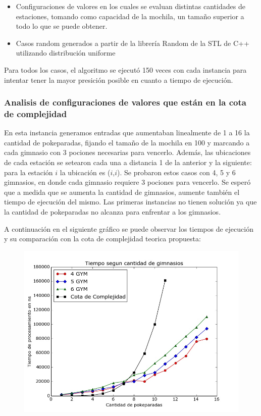       \begin{itemize}
        \item Configuraciones de valores en los cuales se evaluan distintas cantidades de estaciones, tomando como capacidad de la mochila, un tamaño superior a todo lo que se puede obtener.
        \item Casos random generados a partir de la librería Random de la STL de C++ utilizando distribución uniforme
      \end{itemize}

      Para todos los casos, el algoritmo se ejecutó 150 veces con cada instancia para intentar tener la mayor presición posible en cuanto a tiempo de ejecución.

      \subsubsection{Analisis de configuraciones de valores que están en la cota de complejidad}
      En esta instancia generamos entradas que aumentaban linealmente de 1 a 16 la cantidad de pokeparadas, fijando el tamaño de la mochila en 100 y marcando a cada gimnasio con 3 pociones necesarias para vencerlo. Además, las ubicaciones de cada estación se setearon cada una a distancia 1 de la anterior y la siguiente: para la estación $i$ la ubicación es ($i$,$i$).
      Se probaron estos casos con 4, 5 y 6 gimnasios, en donde cada gimnasio requiere 3 pociones para vencerlo. Se esperó que a medida que se aumenta la cantidad de gimnasios, aumente también el tiempo de ejecución del mismo. Las primeras instancias no tienen solución ya que la cantidad de pokeparadas no alcanza para enfrentar a los gimnasios.

      A continuación en el siguiente gráfico se puede observar los tiempos de ejecución y su comparación con la cota de complejidad teorica propuesta:


      \begin{figure}[H]
      \begin{center}
        \includegraphics[width=1.0\columnwidth]{imagenes/exp4_ej2.jpeg}
        \caption{}
      \end{center}
  \end{figure}


